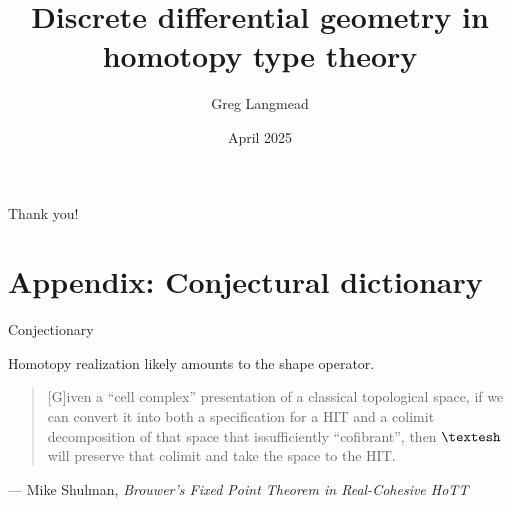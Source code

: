 \documentclass[13pt,aspectratio=169,hyperref={hypertexnames = false},handout]{beamer}
\title[Geometry in HoTT]{Discrete differential geometry in homotopy type theory}
\author{Greg Langmead}
\institute[CMU]{Carnegie Mellon University}
\date{April 2025}
\begin{document}
\begin{frame}
\titlepage
\end{frame}

\newlength{\mylen}
\newlength{\mylin}

% 
% 
% 
% 
% 
% 

\begin{frame}
\begin{center}
\alert{\huge{Thank you!}}
\end{center}
\end{frame}

\section{Appendix: Conjectural dictionary}
\renewcommand{\arraystretch}{1.4}
\begin{frame}{Conjectionary}

Homotopy realization likely amounts to the shape operator.
\bigskip

\begin{quote}
[G]iven a ``cell complex'' presentation of a classical topological space, if we can convert it into both a specification for a HIT and a colimit decomposition of that space that issufficiently ``cofibrant'', then \( \shape \) will preserve that colimit and take the space to the HIT.
\end{quote}
\begin{flushright}
— Mike Shulman, \emph{Brouwer's Fixed Point Theorem in Real-Cohesive HoTT}
\end{flushright}
\end{frame}
\end{document}
